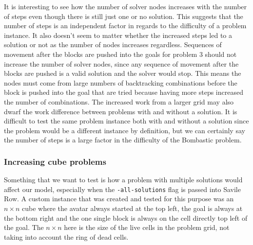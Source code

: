 \documentclass{article}
\begin{document}
It is interesting to see how the number of solver nodes increases with the number of steps even though there is still just one or no solution. This suggests that the number of steps is an independent factor in regards to the difficulty of a problem instance. It also doesn't seem to matter whether the increased steps led to a solution or not as the number of nodes increases regardless. Sequences of movement after the blocks are pushed into the goals for problem 3 should not increase the number of solver nodes, since any sequence of movement after the blocks are pushed is a valid solution and the solver would stop. This means the nodes must come from large numbers of backtracking combinations before the block is pushed into the goal that are tried because having more steps increased the number of combinations. The increased work from a larger grid may also dwarf the work difference between problems with and without a solution. It is difficult to test the same problem instance both with and without a solution since the problem would be a different instance by definition, but we can certainly say the number of steps is a large factor in the difficulty of the Bombastic problem. 


\subsubsection{Increasing cube problems}
Something that we want to test is how a problem with multiple solutions would affect our model, especially when the \texttt{-all-solutions} flag is passed into Savile Row. A custom instance that was created and tested for this purpose was an $n \times n$ cube where the avatar always started at the top left, the goal is always at the bottom right and the one single block is always on the cell directly top left of the goal. The $n \times n$ here is the size of the live cells in the problem grid, not taking into account the ring of dead cells. 
\end{document}
